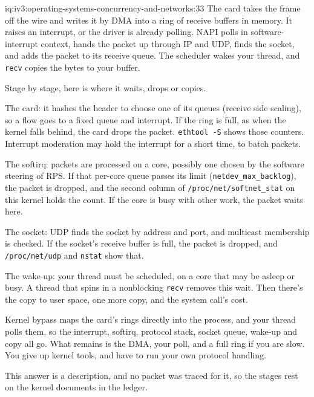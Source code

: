 \begin{solution}{iq:iv3:operating-systems-concurrency-and-networks:33}
The card takes the frame off the wire and writes it by DMA into a ring of receive buffers in memory. It raises an interrupt, or the driver is already polling. NAPI polls in software-interrupt context, hands the packet up through IP and UDP, finds the socket, and adds the packet to its receive queue. The scheduler wakes your thread, and \texttt{recv} copies the bytes to your buffer.

Stage by stage, here is where it waits, drops or copies.

The card: it hashes the header to choose one of its queues (receive side scaling), so a flow goes to a fixed queue and interrupt. If the ring is full, as when the kernel falls behind, the card drops the packet. \texttt{ethtool -S} shows those counters. Interrupt moderation may hold the interrupt for a short time, to batch packets.

The softirq: packets are processed on a core, possibly one chosen by the software steering of RPS. If that per-core queue passes its limit (\texttt{netdev\_max\_backlog}), the packet is dropped, and the second column of \texttt{/proc/net/softnet\_stat} on this kernel holds the count. If the core is busy with other work, the packet waits here.

The socket: UDP finds the socket by address and port, and multicast membership is checked. If the socket's receive buffer is full, the packet is dropped, and \texttt{/proc/net/udp} and \texttt{nstat} show that.

The wake-up: your thread must be scheduled, on a core that may be asleep or busy. A thread that spins in a nonblocking \texttt{recv} removes this wait. Then there's the copy to user space, one more copy, and the system call's cost.

Kernel bypass maps the card's rings directly into the process, and your thread polls them, so the interrupt, softirq, protocol stack, socket queue, wake-up and copy all go. What remains is the DMA, your poll, and a full ring if you are slow. You give up kernel tools, and have to run your own protocol handling.

This answer is a description, and no packet was traced for it, so the stages rest on the kernel documents in the ledger.

\end{solution}

